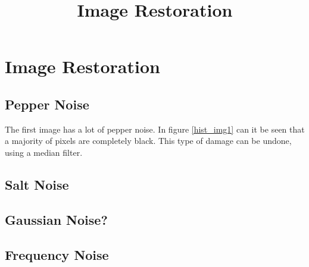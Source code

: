\documentclass[12pt,a4paper]{article}
\begin{document}
\title{Image Restoration}
\maketitle

\pagebreak


\section{Image Restoration}



\subsection{Pepper Noise}
The first image has a lot of pepper noise.
In figure \ref{hist_img1} can it be seen that a majority of pixels are completely black.
This type of damage can be undone, using a median filter.

\subsection{Salt Noise}


\subsection{Gaussian Noise?}


\subsection{Frequency Noise}
\end{document}
